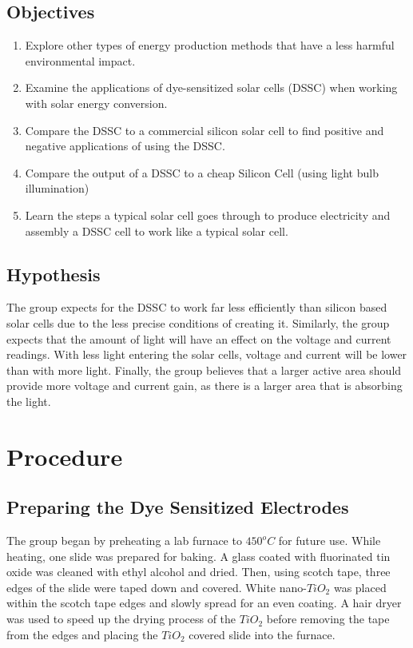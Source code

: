 \documentclass{article}
\begin{document}
\subsection{Objectives}
\begin{enumerate}
\item Explore other types of energy production methods that have a less harmful environmental impact.
\item Examine the applications of dye-sensitized solar cells (DSSC) when working with solar energy conversion. 
\item Compare the DSSC to a commercial silicon solar cell to find positive and negative applications of using the DSSC.
\item Compare the output of a DSSC to a cheap Silicon Cell (using light bulb illumination)
\item Learn the steps a typical solar cell goes through to produce electricity and assembly a DSSC cell to work like a typical solar cell.

\end{enumerate}

\subsection{Hypothesis}
The group expects for the DSSC to work far less efficiently than silicon based solar cells due to the less precise conditions of creating it. Similarly, the group expects that the amount of light will have an effect on the voltage and current readings. With less light entering the solar cells, voltage and current will be lower than with more light. Finally, the group believes that a larger active area should provide more voltage and current gain, as there is a larger area that is absorbing the light. 


\section{Procedure}
\subsection{Preparing the Dye Sensitized Electrodes}
The group began by preheating a lab furnace to $450^oC$ for future use. While heating, one slide was prepared for baking. A glass coated with fluorinated tin oxide was cleaned with ethyl alcohol and dried. Then, using scotch tape, three edges of the slide were taped down and covered. White nano-$TiO_2$ was placed within the scotch tape edges and slowly spread for an even coating. A hair dryer was used to speed up the drying process of the $TiO_2$ before removing the tape from the edges and placing the $TiO_2$ covered slide into the furnace.
\end{document}
